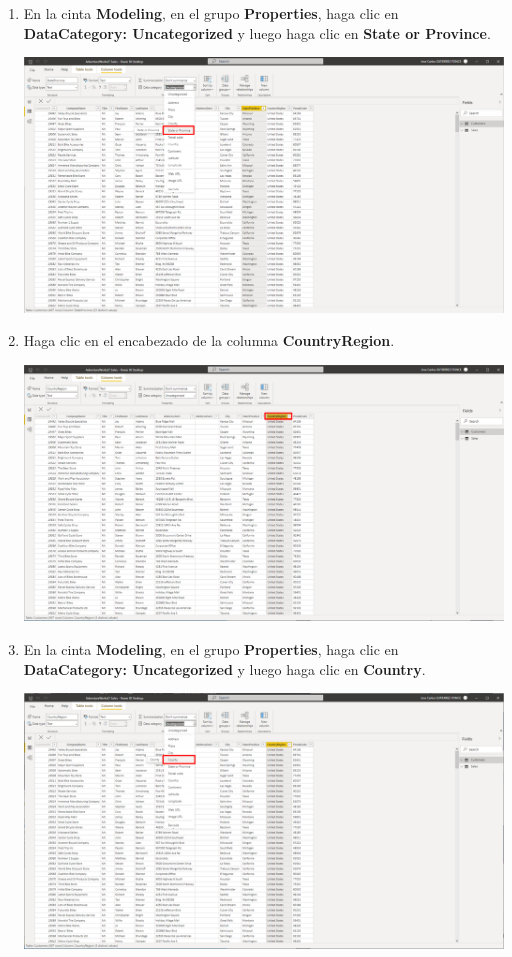 \documentclass[12pt,letterpaper]{article}
\newcommand\tab[1][1cm]{\hspace*{#1}}
\begin{document}
\begin{enumerate}[\tab 1.]
\begin{center}
        \end{center}
        \item En la cinta \textbf{Modeling}, en el grupo \textbf{Properties}, haga clic en \textbf{DataCategory: Uncategorized} y luego haga clic en \textbf{State or Province}.
        \begin{center}
            \includegraphics[width=13cm]{./img/img29.png}
        \end{center}
        \item Haga clic en el encabezado de la columna \textbf{CountryRegion}.
        \begin{center}
            \includegraphics[width=13cm]{./img/img30.png}
        \end{center}
        \item En la cinta \textbf{Modeling}, en el grupo \textbf{Properties}, haga clic en \textbf{DataCategory: Uncategorized} y luego haga clic en \textbf{Country}.
        \begin{center}
            \includegraphics[width=13cm]{./img/img31.png}

\end{center}
\end{enumerate}
\end{document}
